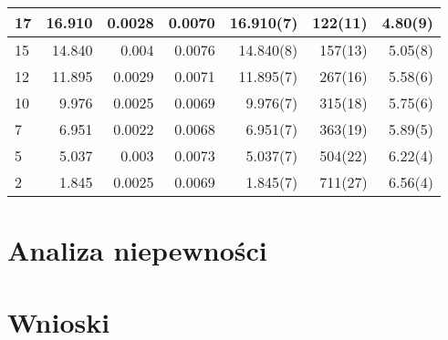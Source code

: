 \documentclass[a4paper,10pt]{article}
\begin{document}
\begin{tabular}{|l|r|r|r|r|r|r|}
17 &  16.910 &  0.0028 &  0.0070 &  16.910(7) &  122(11) &  4.80(9) \\\hline
15 &  14.840 &  0.004  &  0.0076 &  14.840(8) &  157(13) &  5.05(8) \\\hline
12 &  11.895 &  0.0029 &  0.0071 &  11.895(7) &  267(16) &  5.58(6) \\\hline
10 &   9.976 &  0.0025 &  0.0069 &   9.976(7) &  315(18) &  5.75(6) \\\hline
7 &   6.951  &  0.0022 &  0.0068 &   6.951(7) &  363(19) &  5.89(5) \\\hline
5 &   5.037  &  0.003  &  0.0073 &   5.037(7) &  504(22) &  6.22(4) \\\hline
2 &   1.845  &  0.0025 &  0.0069 &   1.845(7) &  711(27) &  6.56(4) \\\hline
\end{tabular}


\section{Analiza niepewności}

 \section{Wnioski}
\end{document}
